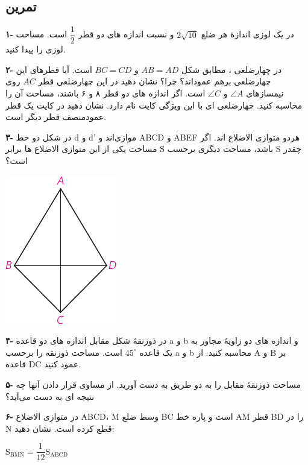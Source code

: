 \documentclass[12pt, a4paper, twoside]{book}
\begin{document}
\subsection{تمرین}
\begin{multicols}{2}


\textbf{۱- }در یک لوزی اندازهٔ هر ضلع 
$2\sqrt{10}$
و نسبت اندازه های دو قطر
$\dfrac12$
است. مساحت لوزی را پیدا کنید.

\bigskip

\textbf{۲-} در چهارضلعی
،
مطابق شکل 
$AB = AD$
و
$BC = CD$
است. آیا قطرهای این چهارضلعی برهم عموداند؟ چرا؟ نشان دهید در این چهارضلعی قطر 
$AC$
روی نیمسازهای
$\angle A$
و
$\angle C$
است. اگر اندازه های دو قطر ۸ و ۶ باشند، مساحت آن را محاسبه کنید. چهارضلعی ای با این ویژگی کایت نام دارد. نشان دهید در کایت یک قطر عمودمنصف قطر دیگر است.
\bigskip

\textbf{۳-}
در شکل دو خط d و d' موازی‌اند و ABCD و ABEF هردو متوازی الاضلاع اند. اگر مساحت یکی از این متوازی الاضلاع ها برابر S باشد، مساحت دیگری برحسب S چقدر است؟

	\begin{center}
	\includegraphics{"Shapes/Fasl - 3/Dars 2/P72-S1.pdf"}
\end{center}

\bigskip
\textbf{۴-}
در ذوزنقهٔ شکل مقابل اندازه های دو قاعده a و b و اندازه های دو زاویهٔ مجاور به یک قاعده 
$45^{\circ}$
 است. مساحت ذوزنقه را برحسب a و b محاسبه کنید. از A و B بر قاعده DC عمود کنید.

\bigskip
\textbf{۵-}
مساحت ذوزنقهٔ مقابل را به دو طریق به دست آورید. از مساوی قرار دادن آنها چه نتیجه ای به دست می‌آید؟

\bigskip
\textbf{۶-}
در متوازی الاضلاع ABCD، M وسط ضلع BC است و پاره خط AM قطر BD را در N قطع کرده است. نشان دهید: 
\begin{flushleft}
	$
\mathrm{S}_{\mathrm{BMN}} = \dfrac{1}{12} \mathrm{S}_{\mathrm{ABCD}}
	$
\end{flushleft}


\end{multicols}
\end{document}
